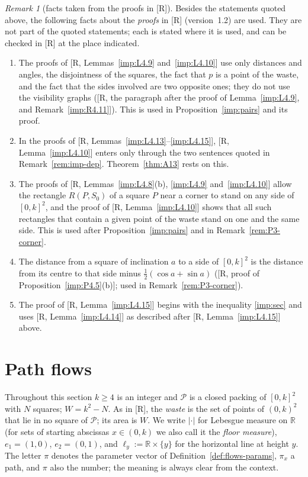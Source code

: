 \documentclass[11pt]{amsart}
\newcommand{\R}{\mathbb R}
\theoremstyle{definition}
\theoremstyle{remark}
\newtheorem{remark}[theorem]{Remark}
\numberwithin{equation}{section}
\begin{document}
\begin{remark}[facts taken from the proofs in {[R]}]\label{rem:imp-proofs}
Besides the statements quoted above, the following facts about the \emph{proofs} in [R] (version~1.2) are used. They
are not part of the quoted statements; each is stated where it is used, and can be checked in [R] at the place
indicated.
\begin{enumerate}[label=(\alph*)]
\item The proofs of [R, Lemmas~\ref{imp:L4.9} and~\ref{imp:L4.10}] use only distances and angles, the disjointness of
the squares, the fact that $p$ is a point of the waste, and the fact that the sides involved are two opposite ones;
they do not use the visibility graphs ([R, the paragraph after the proof of Lemma~\ref{imp:L4.9}, and
Remark~\ref{imp:R4.11}]). This is used in Proposition~\ref{imp:pairs} and its proof.
\item In the proofs of [R, Lemmas~\ref{imp:L4.13}--\ref{imp:L4.15}], [R, Lemma~\ref{imp:L4.10}] enters only through
the two sentences quoted in Remark~\ref{rem:imp-dep}. Theorem~\ref{thm:A13} rests on this.
\item The proofs of [R, Lemmas~\ref{imp:L4.8}(b), \ref{imp:L4.9} and~\ref{imp:L4.10}] allow the rectangle $R(P,S_0)$ of a
square $P$ near a corner to stand on any side of $[0,k]^2$, and the proof of [R, Lemma~\ref{imp:L4.10}] shows that all
such rectangles that contain a given point of the waste stand on one and the same side. This is used after
Proposition~\ref{imp:pairs} and in Remark~\ref{rem:P3-corner}.
\item The distance from a square of inclination $a$ to a side of $[0,k]^2$ is the distance from its centre to that side
minus $\frac12(\cos a+\sin a)$ ([R, proof of Proposition~\ref{imp:P4.5}(b)]; used in Remark~\ref{rem:P3-corner}).
\item The proof of [R, Lemma~\ref{imp:L4.15}] begins with the inequality \eqref{imp:sec} and uses
[R, Lemma~\ref{imp:L4.14}] as described after [R, Lemma~\ref{imp:L4.15}] above.
\end{enumerate}
\end{remark}

\section{Path flows}\label{sec:flows}

Throughout this section $k\ge4$ is an integer and $\mathcal P$ is a closed packing of $[0,k]^2$ with $N$ squares;
$W=k^2-N$. As in [R], the \emph{waste} is the set of points of $(0,k)^2$ that lie in no square of $\mathcal P$; its
area is $W$. We write $|\cdot|$ for Lebesgue measure on $\R$ (for sets of starting abscissas $x\in(0,k)$ we also call
it the \emph{floor measure}), $e_1=(1,0)$, $e_2=(0,1)$, and $\ell_y:=\R\times\{y\}$ for the horizontal line at height
$y$. The letter $\pi$ denotes the parameter vector of Definition~\ref{def:flows-params}, $\pi_x$ a path, and $\pi$ also
the number; the meaning is always clear from the context.
\end{document}
